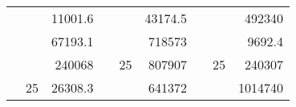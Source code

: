 \begin{table}[H]
\begin{tabular}{|ccrccrccc}
\rowcolor[HTML]{DAE8FC} 
\multicolumn{1}{|c|}{\cellcolor[HTML]{FFFFC7}}                                & \multicolumn{1}{c|}{\cellcolor[HTML]{DAE8FC}}                      & \multicolumn{1}{r|}{\cellcolor[HTML]{DAE8FC}11001.6}   & \multicolumn{1}{c|}{\cellcolor[HTML]{FFFFC7}}                                & \multicolumn{1}{c|}{\cellcolor[HTML]{DAE8FC}}                       & \multicolumn{1}{r|}{\cellcolor[HTML]{DAE8FC}43174.5}   & \multicolumn{1}{c|}{\cellcolor[HTML]{FFFFC7}}                                & \multicolumn{1}{c|}{\cellcolor[HTML]{DAE8FC}}                      & \multicolumn{1}{r|}{\cellcolor[HTML]{DAE8FC}492340}    \\ \cline{3-3} \cline{6-6} \cline{9-9} 
\multicolumn{1}{|c|}{\cellcolor[HTML]{FFFFC7}}                                & \multicolumn{1}{c|}{\cellcolor[HTML]{DAE8FC}}                      & \multicolumn{1}{r|}{\cellcolor[HTML]{DDFDFF}67193.1}   & \multicolumn{1}{c|}{\cellcolor[HTML]{FFFFC7}}                                & \multicolumn{1}{c|}{\cellcolor[HTML]{DAE8FC}}                       & \multicolumn{1}{r|}{\cellcolor[HTML]{DDFDFF}718573}    & \multicolumn{1}{c|}{\cellcolor[HTML]{FFFFC7}}                                & \multicolumn{1}{c|}{\cellcolor[HTML]{DAE8FC}}                      & \multicolumn{1}{r|}{\cellcolor[HTML]{DDFDFF}9692.4}    \\ \cline{3-3} \cline{6-6} \cline{9-9} 
\rowcolor[HTML]{DAE8FC} 
\multicolumn{1}{|c|}{\cellcolor[HTML]{FFFFC7}}                                & \multicolumn{1}{c|}{\cellcolor[HTML]{DAE8FC}}                      & \multicolumn{1}{r|}{\cellcolor[HTML]{DAE8FC}240068}    & \multicolumn{1}{c|}{\cellcolor[HTML]{FFFFC7}}                                & \multicolumn{1}{c|}{\multirow{-9}{*}{\cellcolor[HTML]{DAE8FC}25}}   & \multicolumn{1}{r|}{\cellcolor[HTML]{DAE8FC}807907}    & \multicolumn{1}{c|}{\cellcolor[HTML]{FFFFC7}}                                & \multicolumn{1}{c|}{\multirow{-9}{*}{\cellcolor[HTML]{DAE8FC}25}}  & \multicolumn{1}{r|}{\cellcolor[HTML]{DAE8FC}240307}    \\ \cline{3-3} \cline{5-6} \cline{8-9} 
\multicolumn{1}{|c|}{\cellcolor[HTML]{FFFFC7}}                                & \multicolumn{1}{c|}{\multirow{-10}{*}{\cellcolor[HTML]{DAE8FC}25}} & \multicolumn{1}{r|}{\cellcolor[HTML]{DDFDFF}26308.3}   & \multicolumn{1}{c|}{\cellcolor[HTML]{FFFFC7}}                                & \multicolumn{1}{c|}{\cellcolor[HTML]{DDFDFF}}                       & \multicolumn{1}{r|}{\cellcolor[HTML]{DAE8FC}641372}    & \multicolumn{1}{c|}{\cellcolor[HTML]{FFFFC7}}                                & \multicolumn{1}{c|}{\cellcolor[HTML]{DDFDFF}}                      & \multicolumn{1}{r|}{\cellcolor[HTML]{DAE8FC}1014740}   \\ \cline{2-3} \cline{6-6} \cline{9-9} 

\end{tabular}
\end{table}
